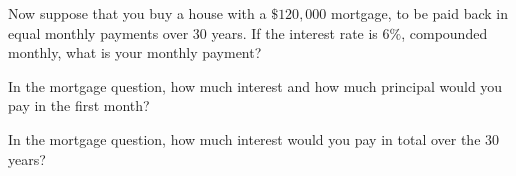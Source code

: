 \documentclass{ximera}
\begin{document}
\begin{question}
Now suppose that you buy a house with a $\$120,000$ mortgage, to be paid back in equal monthly payments over $30$ years.  If the interest rate is $6\%$, compounded monthly, what is your monthly payment?  
\begin{freeResponse}
\end{freeResponse}
\end{question}

\begin{question}
In the mortgage question, how much interest and how much principal would you pay in the first month? 
\begin{freeResponse}
\end{freeResponse}
\end{question}

\begin{question}
In the mortgage question, how much interest would you pay in total over the $30$ years? 
\begin{freeResponse}
\end{freeResponse}
\end{question}
\end{document}
